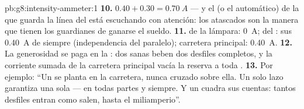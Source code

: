 \begin{solution}{pb:g8:intensity-ammeter:1}
\textbf{10.} $0.40 + 0.30 = \qty{0.70}{A}$ --- y el
 (o el automático) de la  que guarda la línea
del  está escuchando con atención: los 
atascados son la manera que tienen los guardianes de ganarse el
sueldo.
\textbf{11.}  de la lámpara: \qty{0}{A};  del
: sus \qty{0.40}{A} de siempre (independencia del paralelo);
carretera principal: \qty{0.40}{A}.
\textbf{12.} La generosidad se paga en la : dos
 sanas beben dos desfiles completos, y la corriente sumada
de la carretera principal vacía la reserva a toda .
\textbf{13.} Por ejemplo: ``Un  se planta en la
carretera, nunca cruzado sobre ella. Un solo lazo garantiza una sola
 --- en todas partes y siempre. Y un
 cuadra sus cuentas: tantos desfiles entran como salen, hasta
el miliamperio''.
\end{solution}
